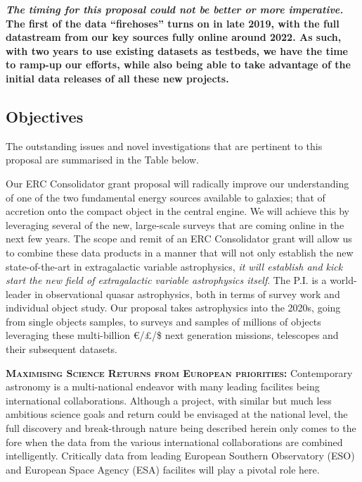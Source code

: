 \smallskip
\smallskip
\noindent
{\bf \emph{The timing for this proposal could not be better or more imperative.} 
The first of the data ``firehoses'' turns on in late 2019, with
the full datastream from our key sources fully online around 2022. 
As such, with two years to use existing datasets as testbeds, we 
have the time to ramp-up our efforts, while also being able to 
take advantage of the initial data releases of all these new projects.}


\subsection{Objectives}
\smallskip
\smallskip
\noindent
The outstanding issues and novel investigations 
that are pertinent to this proposal are summarised in the Table below. 


\smallskip
\smallskip
\noindent
Our ERC Consolidator grant proposal will radically improve our
understanding of one of the two fundamental energy sources available
to galaxies; that of accretion onto the compact object in the central
engine. We will achieve this by leveraging several of the new,
large-scale surveys that are coming online in the next few years.  The
scope and remit of an ERC Consolidator grant will allow us to combine
these data products in a manner that will not only establish the new
state-of-the-art in extragalactic variable astrophysics, {\it it will
establish and kick start the new field of extragalactic variable
astrophysics itself}.  The P.I. is a world-leader in observational quasar
astrophysics, both in terms of survey work and individual object
study.  Our proposal takes astrophysics into the 2020s, going from
single objects samples, to surveys and samples of millions of objects
leveraging these multi-billion \euro/\pounds/\$ next generation
missions, telescopes and their subsequent datasets.

\smallskip
\smallskip
\noindent



\smallskip
\smallskip
\noindent
\textbf{\textsc{Maximising Science Returns from European priorities:}}
Contemporary astronomy is a multi-national endeavor with many leading
facilites being international collaborations. Although a project, with
similar but much less ambitious science goals and return could be
envisaged at the national level, the full discovery and break-through
nature being described herein only comes to the fore when the data
from the various international collaborations are combined
intelligently.  Critically data from leading European Southern
Observatory (ESO) and European Space Agency (ESA) facilites will play
a pivotal role here.




\smallskip

